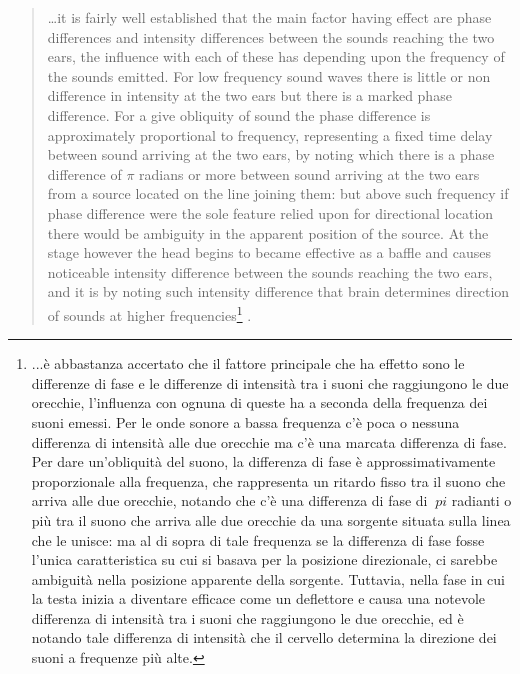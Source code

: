 \begin{quotation}
…it is fairly well established that the main factor having effect are phase
differences and intensity differences between the sounds reaching the two ears,
the influence with each of these has depending upon the frequency of the sounds
emitted. For low frequency sound waves there is little or non difference in
intensity at the two ears but there is a marked phase difference. For a give
obliquity of sound the phase difference is approximately proportional to
frequency, representing a fixed time delay between sound arriving at the two
ears, by noting which there is a phase difference of $\pi$ radians or more
between sound arriving at the two ears from a source located on the line joining
them: but above such frequency if phase difference were the sole feature relied
upon for directional location there would be ambiguity in the apparent position
of the source. At the stage however the head begins to became effective as a
baffle and causes noticeable intensity difference between the sounds reaching
the two ears, and it is by noting such intensity difference that brain
determines direction of sounds at higher frequencies\footnote{...è abbastanza accertato che il fattore principale che ha effetto sono le differenze di fase e le differenze di intensità tra i suoni che raggiungono le due orecchie, l'influenza con ognuna di queste ha a seconda della frequenza dei suoni emessi. Per le onde sonore a bassa frequenza c'è poca o nessuna differenza di intensità alle due orecchie ma c'è una marcata differenza di fase. Per dare un'obliquità del suono, la differenza di fase è approssimativamente proporzionale alla frequenza, che rappresenta un ritardo fisso tra il suono che arriva alle due orecchie, notando che c'è una differenza di fase di $ \ pi $ radianti o più tra il suono che arriva alle due orecchie da una sorgente situata sulla linea che le unisce: ma al di sopra di tale frequenza se la differenza di fase fosse l'unica caratteristica su cui si basava per la posizione direzionale, ci sarebbe ambiguità nella posizione apparente della sorgente. Tuttavia, nella fase in cui la testa inizia a diventare efficace come un deflettore e causa una notevole differenza di intensità tra i suoni che raggiungono le due orecchie, ed è notando tale differenza di intensità che il cervello determina la direzione dei suoni a frequenze più alte.} .\cite{ab58}
\end{quotation}

